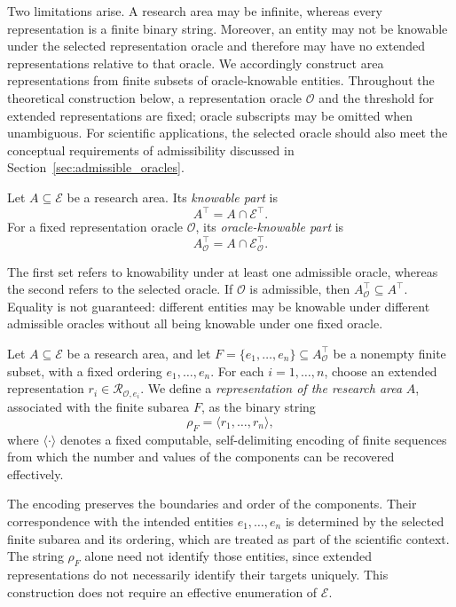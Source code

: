 Two limitations arise. A research area may be infinite, whereas every representation is a finite binary string. Moreover, an entity may not be knowable under the selected representation oracle and therefore may have no extended representations relative to that oracle. We accordingly construct area representations from finite subsets of oracle-knowable entities. Throughout the theoretical construction below, a representation oracle $\mathcal O$ and the threshold for extended representations are fixed; oracle subscripts may be omitted when unambiguous. For scientific applications, the selected oracle should also meet the conceptual requirements of admissibility discussed in Section~\ref{sec:admissible_oracles}.

\begin{definition}
Let $A\subseteq\mathcal E$ be a research area. Its \emph{knowable part} is
\[
A^\top=A\cap\mathcal E^\top.
\]
For a fixed representation oracle $\mathcal O$, its \emph{oracle-knowable part} is
\[
A^\top_{\mathcal O}=A\cap\mathcal E^\top_{\mathcal O}.
\]
\end{definition}

The first set refers to knowability under at least one admissible oracle, whereas the second refers to the selected oracle. If $\mathcal O$ is admissible, then $A^\top_{\mathcal O}\subseteq A^\top$. Equality is not guaranteed: different entities may be knowable under different admissible oracles without all being knowable under one fixed oracle.

\begin{definition}
Let $A\subseteq\mathcal E$ be a research area, and let $F=\{e_1,\ldots,e_n\}\subseteq A^\top_{\mathcal O}$ be a nonempty finite subset, with a fixed ordering $e_1,\ldots,e_n$. For each $i=1,\ldots,n$, choose an extended representation $r_i\in\mathcal R_{\mathcal O,e_i}$. We define a \emph{representation of the research area} $A$, associated with the finite subarea $F$, as the binary string
\[
\rho_F=\langle r_1,\ldots,r_n\rangle,
\]
where $\langle\cdot\rangle$ denotes a fixed computable, self-delimiting encoding of finite sequences from which the number and values of the components can be recovered effectively.
\end{definition}

The encoding preserves the boundaries and order of the components. Their correspondence with the intended entities $e_1,\ldots,e_n$ is determined by the selected finite subarea and its ordering, which are treated as part of the scientific context. The string $\rho_F$ alone need not identify those entities, since extended representations do not necessarily identify their targets uniquely. This construction does not require an effective enumeration of $\mathcal E$.

